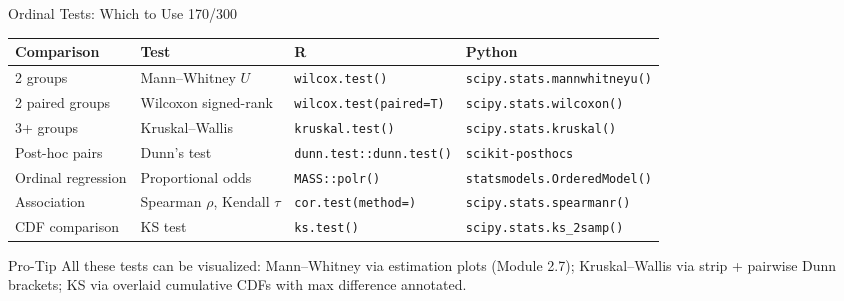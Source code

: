 \documentclass[10pt]{beamer}
\newcommand{\smark}[1]{\hfill{\scriptsize\color{codegray}#1}}
\begin{document}
\begin{frame}{Ordinal Tests: Which to Use}
\smark{170/300}
\centering\small
\begin{tabular}{@{}llll@{}}
    \toprule
    \textbf{Comparison} & \textbf{Test} & \textbf{R} & \textbf{Python} \\
    \midrule
    2 groups         & Mann--Whitney $U$         & \texttt{wilcox.test()}        & \texttt{scipy.stats.mannwhitneyu()} \\
    2 paired groups  & Wilcoxon signed-rank      & \texttt{wilcox.test(paired=T)} & \texttt{scipy.stats.wilcoxon()} \\
    3+ groups        & Kruskal--Wallis           & \texttt{kruskal.test()}       & \texttt{scipy.stats.kruskal()} \\
    Post-hoc pairs   & Dunn's test               & \texttt{dunn.test::dunn.test()} & \texttt{scikit-posthocs} \\
    Ordinal regression& Proportional odds        & \texttt{MASS::polr()}         & \texttt{statsmodels.OrderedModel()} \\
    Association       & Spearman $\rho$, Kendall $\tau$ & \texttt{cor.test(method=)} & \texttt{scipy.stats.spearmanr()} \\
    CDF comparison    & KS test                  & \texttt{ks.test()}            & \texttt{scipy.stats.ks\_2samp()} \\
    \bottomrule
\end{tabular}

\vspace{0.2cm}
\begin{alertblock}{Pro-Tip}
    \scriptsize All these tests can be visualized: Mann--Whitney via estimation plots (Module 2.7); Kruskal--Wallis via strip + pairwise Dunn brackets; KS via overlaid cumulative CDFs with max difference annotated.
\end{alertblock}
\end{frame}
\end{document}
